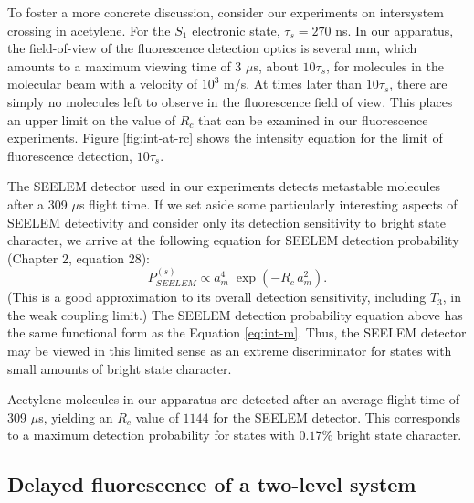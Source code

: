 \documentclass[12pt,draft]{mitthesis}
\begin{document}
To foster a more concrete discussion, consider our experiments on
intersystem crossing in acetylene.  For the $S_1$ electronic state,
$\tau_s=270$ ns.  In our apparatus, the field-of-view of the
fluorescence detection optics is several mm, which amounts to a
maximum viewing time of 3 $\mu$s, about $10\tau_s$, for molecules in
the molecular beam with a velocity of $10^3$ m/s.  At times later than
$10\tau_s$, there are simply no molecules left to observe in the
fluorescence field of view.  This places an upper limit on the value
of $R_c$ that can be examined in our fluorescence experiments.  Figure
\ref{fig:int-at-rc} shows the intensity equation for the limit of
fluorescence detection, $10\tau_s$.

The SEELEM detector used in our experiments detects metastable
molecules after a 309 $\mu$s flight time.  If we set aside some
particularly interesting aspects of SEELEM detectivity and consider
only its detection sensitivity to bright state character, we arrive at
the following equation for SEELEM detection probability (Chapter 2,
equation 28):
\begin{equation}
  \label{eq:seelem-prob-s}
  P_{SEELEM}^{(s)} \propto a_m^4 \; \exp \left( -R_c \, a_m^2 \right).
\end{equation}
(This is a good approximation to its overall detection sensitivity,
including $T_3$, in the weak coupling limit.)  The SEELEM detection
probability equation above has the same functional form as the
Equation \ref{eq:int-m}.  Thus, the SEELEM detector may be viewed in
this limited sense as an extreme discriminator for states with small
amounts of bright state character.

Acetylene molecules in our apparatus are detected after an average
flight time of 309 $\mu$s, yielding an $R_c$ value of $1144$ for the
SEELEM detector.  This corresponds to a maximum detection probability
for states with $0.17\%$ bright state character.

\subsection{Delayed fluorescence of a two-level system}
\end{document}
